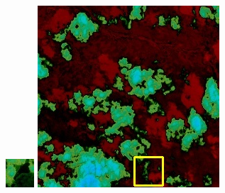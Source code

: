 \documentclass[UTF8]{ctexart}
\begin{document}
\begin{figure}[H]
{\begin{minipage}[b]{0.15\linewidth}
            \includegraphics[width=1\linewidth]{../log/spoon2/cut/tmp_cut_LC80350192014190LGN00_06561_spectral.jpg}\vspace{4pt}
            \includegraphics[width=1\linewidth]{../log/spoon2/cut/LC80980712014024LGN00_15443_spectral.jpg}\vspace{4pt}

\end{minipage}}
\end{figure}
\end{document}
